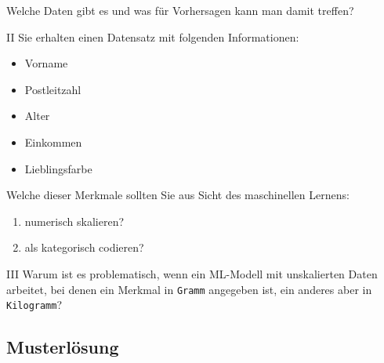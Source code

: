 \begin{lpu}{Welche Daten gibt es und was für Vorhersagen kann man damit treffen?}
\begin{aufgabe}{II}
Sie erhalten einen Datensatz mit folgenden Informationen:  
\begin{itemize}
  \item Vorname
  \item Postleitzahl
  \item Alter
  \item Einkommen
  \item Lieblingsfarbe
\end{itemize}

Welche dieser Merkmale sollten Sie aus Sicht des maschinellen Lernens:
\begin{enumerate}
  \item numerisch skalieren?
  \item als kategorisch codieren?
\end{enumerate}
\end{aufgabe}

\begin{aufgabe}{III}
Warum ist es problematisch, wenn ein ML-Modell mit unskalierten Daten arbeitet, bei denen ein Merkmal in \texttt{Gramm} angegeben ist, ein anderes aber in \texttt{Kilogramm}?
\end{aufgabe}


\end{lpu}

\subsection*{Musterlösung}

